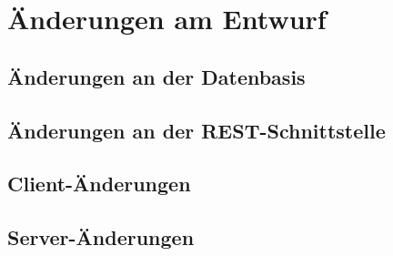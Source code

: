 \FloatBarrier
\section{Änderungen am Entwurf}

\FloatBarrier
\subsection{Änderungen an der Datenbasis}
\label{subsec:changes_database}



\FloatBarrier
\subsection{Änderungen an der REST-Schnittstelle}
\label{subsec:changes_rest}



\FloatBarrier
\subsection{Client-Änderungen}




\FloatBarrier
\subsection{Server-Änderungen}

